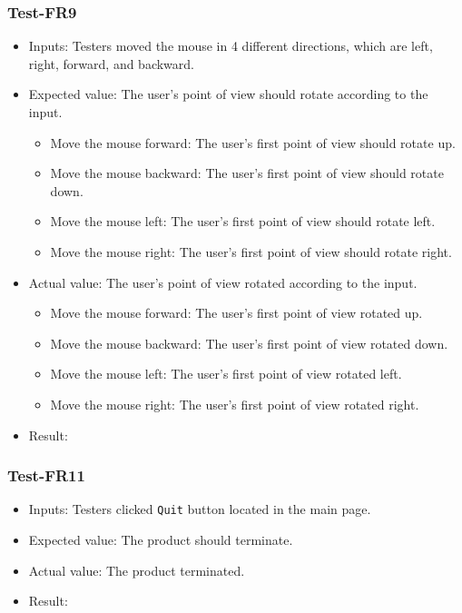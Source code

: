 \documentclass[12pt, titlepage]{article}
\begin{document}
\subsubsection{Test-FR9}
\begin{itemize}
\item Inputs: Testers moved the mouse in 4 different directions, which
are left, right, forward, and backward.
\item Expected value: The user's point of view should rotate according to the input. 
\begin{itemize}
\item Move the mouse forward: The user's first point of view should rotate up.
\item Move the mouse backward: The user's first point of view should rotate 
down.
\item Move the mouse left: The user's first point of view should rotate left.
\item Move the mouse right: The user's first point of view should rotate right.
\end{itemize}

    \item Actual value: The user's point of view rotated according to the input. 
    \begin{itemize}
    \item Move the mouse forward: The user's first point of view rotated up.
    \item Move the mouse backward: The user's first point of view rotated down.
    \item Move the mouse left: The user's first point of view rotated left.
    \item Move the mouse right: The user's first point of view rotated right.
\end{itemize}
    \item Result: \pass
\end{itemize}

\subsubsection{Test-FR11}
\begin{itemize}
    \item Inputs: Testers clicked \verb|Quit| button located in the main page.
    \item Expected value: The product should terminate.
    \item Actual value: The product terminated.
    \item Result: \pass
\end{itemize}
\end{document}
